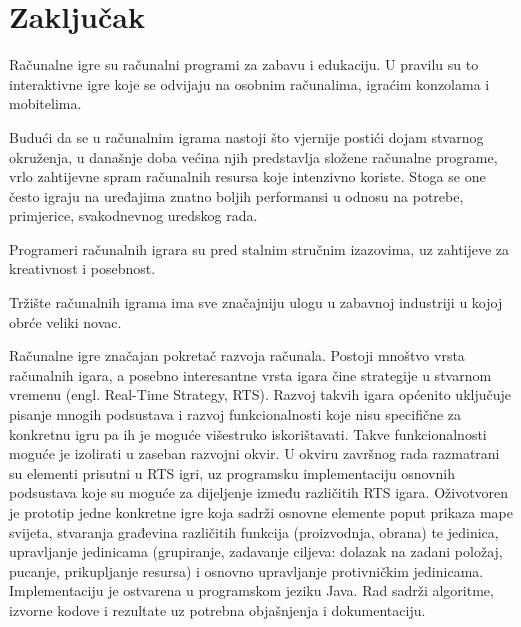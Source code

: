 \documentclass[times, utf8, zavrsni, numeric]{fer}
\begin{document}
\chapter{Zaključak}\label{ch:conclusion}

\par Računalne igre su računalni programi za zabavu i edukaciju.
U pravilu su to interaktivne igre koje se odvijaju na osobnim računalima, igraćim konzolama i mobitelima.

\par Budući da se u računalnim igrama nastoji što vjernije postići dojam stvarnog okruženja, u današnje doba većina njih predstavlja složene računalne programe, vrlo zahtijevne spram računalnih resursa koje intenzivno koriste.
Stoga se one često igraju na uređajima znatno boljih performansi u odnosu na potrebe, primjerice, svakodnevnog uredskog rada.

\par Programeri računalnih igrara su pred stalnim stručnim izazovima, uz zahtijeve za kreativnost i posebnost.

\par Tržište računalnih igrama ima sve značajniju ulogu u zabavnoj industriji u kojoj obrće veliki novac.




\begin{sazetak}
Računalne igre značajan pokretač razvoja računala. 
Postoji mnoštvo vrsta računalnih igara, a posebno  interesantne vrsta igara čine strategije u stvarnom vremenu (engl. Real-Time Strategy, RTS). 
Razvoj takvih igara općenito uključuje pisanje mnogih podsustava i razvoj funkcionalnosti koje nisu specifične za konkretnu  igru pa ih je moguće višestruko iskorištavati.  
Takve funkcionalnosti  moguće je izolirati u zaseban razvojni okvir.
U okviru završnog rada razmatrani su elementi prisutni u RTS igri, uz  programsku implementaciju osnovnih podsustava koje su moguće za dijeljenje između različitih RTS igara. 
Oživotvoren je prototip jedne konkretne igre koja sadrži osnovne elemente poput prikaza mape svijeta, stvaranja građevina različitih  funkcija (proizvodnja, obrana) te jedinica, upravljanje jedinicama (grupiranje, zadavanje ciljeva:  dolazak na zadani položaj, pucanje, prikupljanje resursa) i osnovno upravljanje protivničkim jedinicama. 
Implementaciju je ostvarena u programskom jeziku Java. 
Rad sadrži algoritme, izvorne kodove i rezultate uz potrebna objašnjenja i dokumentaciju.

\end{sazetak}
\end{document}
